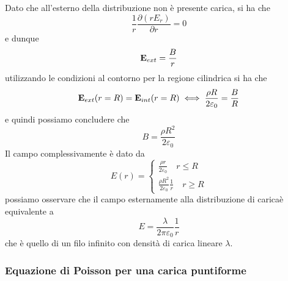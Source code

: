Dato che all'esterno della distribuzione non \`e presente carica, si ha che 
\begin{equation*}
		\frac{1}{r} \frac{\partial (r E_r)}{\partial r} = 0
\end{equation*}
e dunque 
\begin{equation*}
	\bold{E}_{ext} = \frac{B}{r}
\end{equation*}
utilizzando le condizioni al contorno per la regione cilindrica si ha che 
\begin{equation*}
	\bold{E}_{ext}(r=R) = \bold{E}_{int}(r=R) \iff \frac{\rho R}{2 \varepsilon_0} = \frac{B}{R}
\end{equation*}
e quindi possiamo concludere che 
\begin{equation*}
B = \frac{\rho R^2}{2\varepsilon_0}
\end{equation*}
Il campo complessivamente \`e dato da 
\begin{equation*}
	E(r)= \left \{ \begin{array}{l}
		\frac{\rho r}{2 \varepsilon_0} \quad r \leq R \\
		\frac{\rho R^2}{2 \varepsilon_0} \frac{1}{r} \quad r \geq R
	\end{array} \right.
\end{equation*}
possiamo osservare che il campo esternamente alla distribuzione di carica\`e equivalente a 
\begin{equation*}
	E = \frac{\lambda}{2\pi \varepsilon_0} \frac{1}{r}
\end{equation*}
che \`e quello di un filo infinito con densit\`a di carica lineare $\lambda$.

\subsubsection{Equazione di Poisson per una carica puntiforme}

